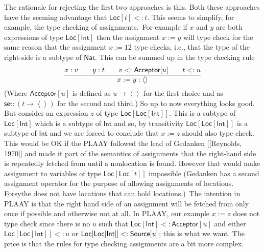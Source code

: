 \documentclass[12pt]{article}
\begin{document}
The rationale for rejecting the first two approaches is this. Both these
approaches have the seeming advantage that $\mathsf{Loc}[t]<:t$. This seems
to simplify, for example, the type checking of assignments.\ For example if $%
x$ and $y$ are both expressions of type $\mathsf{Loc}[\mathsf{Int}]$ then
the assignment $x:=y$ will type check for the same reason that the
assignment $x:=12$ type checks, i.e., that the type of the right-side is a
subtype of $\mathsf{Nat}$. This can be summed up in the type checking rule%
\begin{equation*}
\dfrac{x:v\qquad y:t\qquad v<:\mathsf{Acceptor}[u]\qquad t<:u}{%
x:=y:\left\langle {}\right\rangle }
\end{equation*}%
(Where $\mathsf{Acceptor}[u]$ is defined as $u\rightarrow \left\langle
{}\right\rangle $ for the first choice and as $\mathsf{set}\colon \left(
t\rightarrow \left\langle {}\right\rangle \right) $ for the second and
third.) So up to now everything looks good. But consider an expression $z$
of type $\mathsf{Loc}[\mathsf{Loc}[\mathsf{Int}]]$. This is a subtype of $%
\mathsf{Loc}[\mathsf{Int}]$ which is a subtype of $\mathsf{Int}$ and so, by
transitivity $\mathsf{Loc}[\mathsf{Loc}[\mathsf{Int}]]$ is a subtype of $%
\mathsf{Int}$ and we are forced to conclude that $x:=z$ should also type
check. This would be OK if the PLAAY followed the lead of Gedanken
[[Reynolds, 1970]] and made it part of the semantics of assignments that the
right-hand side is repeatedly fetched from until a nonlocation is found.
However that would make assignment to variables of type $\mathsf{Loc}[%
\mathsf{Loc}[t]]$ impossible (Gedanken has a second assignment operator for
the purpose of allowing assignments of locations. Forsythe does not have
locations that can hold locations.)\ The intention in PLAAY is that the
right hand side of an assignment will be fetched from only once if possible
and otherwise not at all. In PLAAY, our example $x:=z$ does not type check
since there is no $u$ such that $\mathsf{Loc}[\mathsf{Int}]<:\mathsf{Acceptor%
}[u]$ and either $\mathsf{Loc}[\mathsf{Loc}[\mathsf{Int}]]<:u$ or $\mathsf{%
Loc}[\mathsf{Loc}[\mathsf{Int}]]<:\mathsf{Source}[u]$; this is what we want.
The price is that the rules for type checking assignments are a bit more
complex.
\end{document}

